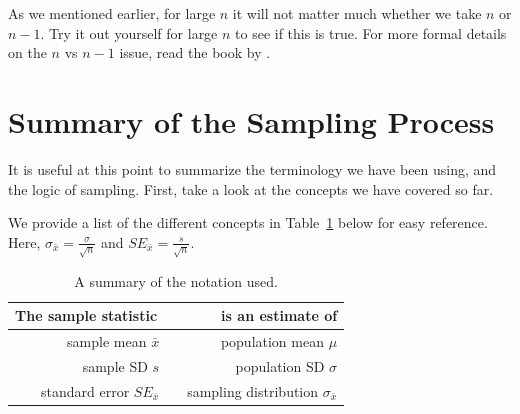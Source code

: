 \documentclass[12pt]{book}\usepackage[]{graphicx}\usepackage[]{color}
\begin{document}
As we mentioned earlier, for large $n$ it will not matter much whether we take $n$ or $n-1$. Try it out yourself for large $n$ to see if this is true. For more formal details on the $n$ vs $n-1$ issue, read the book by \cite{kerns}.

\section{Summary of the Sampling Process}

It is useful at this point to summarize the terminology we have been
using, and the logic of sampling. First, take a look at the concepts
we have covered so far. 

We provide a list of the different concepts in
Table~\ref{summaryofnotation} below for easy reference.
Here, $\sigma_{\bar{x}} = \frac{\sigma}{\sqrt{n}}$ and $SE_{\bar{x}} = \frac{s}{\sqrt{n}}$.

\begin{table}[!htbp]
\begin{center}
\caption{A summary of the notation used.}\label{summaryofnotation}
\begin{tabular}{r|r}
The sample statistic~~ & ~~is an estimate of \\
\hline
sample mean $\bar{x}$~~               & population mean $\mu$   \\
sample SD $s$~~                       & population SD $\sigma$ \\
standard error $SE_{\bar{x}}$~~ & sampling distribution $\sigma_{\bar{x}}$ \\ 
\end{tabular}
\end{center}
\end{table}
\end{document}
